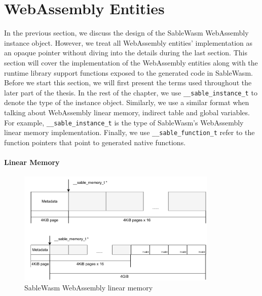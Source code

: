 \section{WebAssembly Entities}

In the previous section, we discuss the design of the SableWasm WebAssembly instance object. However, we treat all WebAssembly entities' implementation as an opaque pointer without diving into the details during the last section. This section will cover the implementation of the WebAssembly entities along with the runtime library support functions exposed to the generated code in SableWasm. Before we start this section, we will first present the terms used throughout the later part of the thesis. In the rest of the chapter, we use \texttt{\_\_sable\_instance\_t} to denote the type of the instance object. Similarly, we use a similar format when talking about WebAssembly linear memory, indirect table and global variables. For example, \texttt{\_\_sable\_instance\_t} is the type of SableWasm's WebAssembly linear memory implementation. Finally, we use \texttt{\_\_sable\_function\_t} refer to the function pointers that point to generated native functions.

\paragraph{Linear Memory}

\begin{figure}
    \centering
    \includegraphics[width=0.85\textwidth]{Images/5.Backend_and_Runtime/memory}
    \caption{SableWasm WebAssembly linear memory}
    \label{fig:backend-memory}
\end{figure}

